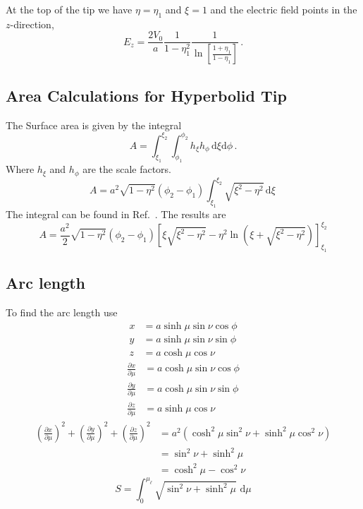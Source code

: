\documentclass[a4paper,10pt]{article}
\numberwithin{equation}{section}
\newcommand{\ud}{\mathrm{d}}
\begin{document}
  At the top of the tip we have \(\eta = \eta_1\) and \(\xi = 1\) and the electric field points in the \(z\)-direction,
  \begin{equation}
    E_z = \frac{2V_0}{a} \frac{1}{1 - \eta_1^2} \frac{1}{\ln \left[ \frac{1+\eta_1}{1-\eta_1} \right]}\, .
  \end{equation}
%
\subsection{Area Calculations for Hyperbolid Tip}
  The Surface area is given by the integral
  \begin{equation}
    A = \int_{\xi_1}^{\xi_2} \int_{\phi_1}^{\phi_2} h_{\xi} h_{\phi}\, \ud\xi \ud\phi\, .
  \end{equation}
  Where \(h_{\xi}\) and \(h_{\phi}\) are the scale factors.
  \begin{equation}
    A = a^2 \sqrt{1 - \eta^2} (\phi_2 - \phi_1) \int_{\xi_1}^{\xi_2} \sqrt{\xi^2 - \eta^2}\, \ud\xi\,
  \end{equation}
  The integral can be found in Ref.~\parencite[eq. 2.271-3]{ryshik2000table}. The results are
  \begin{equation}
    A = \frac{a^2}{2} \sqrt{1-\eta^2} (\phi_2 - \phi_1) \left[ \xi \sqrt{\xi^2 - \eta^2} - \eta^2 \ln\left(\xi + \sqrt{\xi^2 - \eta^2}\right) \right]_{\xi_1}^{\xi_2}
  \end{equation}
%
\subsection{Arc length}
  To find the arc length use
  \begin{equation}\begin{split}
    x &= a \sinh{\mu}\sin{\nu}\cos{\phi}\\
    y &= a \sinh{\mu}\sin{\nu}\sin{\phi}\\
    z &= a \cosh{\mu}\cos{\nu}
  \end{split}\end{equation}
%
  \begin{equation}\begin{split}
    \frac{\partial x}{\partial \mu} &= a \cosh{\mu}\sin{\nu}\cos{\phi}\\
    \frac{\partial y}{\partial \mu} &= a \cosh{\mu}\sin{\nu}\sin{\phi}\\
    \frac{\partial z}{\partial \mu} &= a \sinh{\mu}\cos{\nu}
  \end{split}\end{equation}
%
  \begin{equation}\begin{split}
   \left( \frac{\partial x}{\partial \mu} \right)^2 + \left( \frac{\partial y}{\partial \mu} \right)^2  + \left( \frac{\partial z}{\partial \mu} \right)^2
     &= a^2 \left( \cosh^2{\mu}\sin^2{\nu} + \sinh^2{\mu}\cos^2{\nu} \right)\\
     &= \sin^2{\nu} + \sinh^2{\mu}\\
     &= \cosh^2{\mu} - \cos^2{\nu}
   \end{split}\end{equation}
%
  \begin{equation}
    S = \int_0^{\mu_\ell} \sqrt{\sin^2{\nu} + \sinh^2{\mu}}\,\, \ud\mu
  \end{equation}
%
\end{document}
